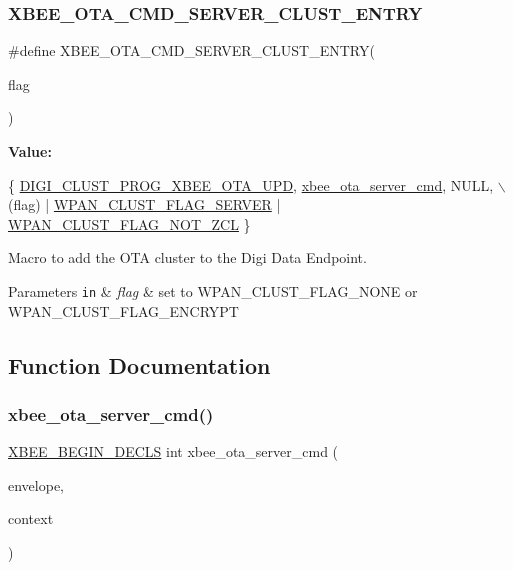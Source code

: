 \subsubsection{\texorpdfstring{X\+B\+E\+E\+\_\+\+O\+T\+A\+\_\+\+C\+M\+D\+\_\+\+S\+E\+R\+V\+E\+R\+\_\+\+C\+L\+U\+S\+T\+\_\+\+E\+N\+T\+RY}{XBEE\_OTA\_CMD\_SERVER\_CLUST\_ENTRY}}
{\footnotesize\ttfamily \#define X\+B\+E\+E\+\_\+\+O\+T\+A\+\_\+\+C\+M\+D\+\_\+\+S\+E\+R\+V\+E\+R\+\_\+\+C\+L\+U\+S\+T\+\_\+\+E\+N\+T\+RY(\begin{DoxyParamCaption}\item[{}]{flag }\end{DoxyParamCaption})}

{\bfseries Value\+:}
\begin{DoxyCode}
\{  \hyperlink{group__wpan__aps_gga1227ab13b41d82d9c9c9080662f74cf7aedb825ada66b8c7bbfbeaee6d9dfba0a}{DIGI\_CLUST\_PROG\_XBEE\_OTA\_UPD},   
      \hyperlink{group__xbee__ota__server_ga22cb77be06faba4020a4f5e0daf48f4f}{xbee\_ota\_server\_cmd}, NULL,         \(\backslash\)
      (flag) | \hyperlink{group__wpan__aps_ga9e0a1a0abf5594d8fa5a38b1ca40b3bc}{WPAN\_CLUST\_FLAG\_SERVER} | 
      \hyperlink{group__wpan__aps_gacb0e365a8c5e72ee90be503513e7e630}{WPAN\_CLUST\_FLAG\_NOT\_ZCL} \}
\end{DoxyCode}


Macro to add the O\+TA cluster to the Digi Data Endpoint. 


\begin{DoxyParams}[1]{Parameters}
\mbox{\tt in}  & {\em flag} & set to W\+P\+A\+N\+\_\+\+C\+L\+U\+S\+T\+\_\+\+F\+L\+A\+G\+\_\+\+N\+O\+NE or W\+P\+A\+N\+\_\+\+C\+L\+U\+S\+T\+\_\+\+F\+L\+A\+G\+\_\+\+E\+N\+C\+R\+Y\+PT \\
\hline
\end{DoxyParams}


\subsection{Function Documentation}
\mbox{\label{group__xbee__ota__server_ga22cb77be06faba4020a4f5e0daf48f4f}} 
\subsubsection{\texorpdfstring{xbee\+\_\+ota\+\_\+server\+\_\+cmd()}{xbee\_ota\_server\_cmd()}}
{\footnotesize\ttfamily \hyperlink{group__hal_ga336bff4f4a6012aacc4468132bbd3d7f}{X\+B\+E\+E\+\_\+\+B\+E\+G\+I\+N\+\_\+\+D\+E\+C\+LS} int xbee\+\_\+ota\+\_\+server\+\_\+cmd (\begin{DoxyParamCaption}\item[{const \hyperlink{structwpan__envelope__t}{wpan\+\_\+envelope\+\_\+t} \hyperlink{group__hal_gaef060b3456fdcc093a7210a762d5f2ed}{F\+AR} $\ast$}]{envelope,  }\item[{void \hyperlink{group__hal_gaef060b3456fdcc093a7210a762d5f2ed}{F\+AR} $\ast$}]{context }\end{DoxyParamCaption})}



